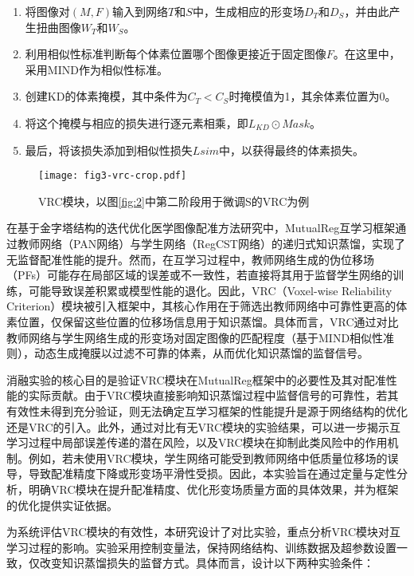 \begin{enumerate}
    \item 将图像对$(M,F)$输入到网络$T$和$S$中，生成相应的形变场$D_T$和$D_S$，并由此产生扭曲图像$W_T$和$W_S$。
    \item 利用相似性标准判断每个体素位置哪个图像更接近于固定图像$F$。在这里中，采用MIND作为相似性标准。
    \item 创建KD的体素掩模，其中条件为$C_T<C_S$时掩模值为1，其余体素位置为0。
    \item 将这个掩模与相应的损失进行逐元素相乘，即$L_{KD} \odot Mask$。
    \item 最后，将该损失添加到相似性损失$L{sim}$中，以获得最终的体素损失。
\end{enumerate}

\begin{figure}[h]
    \centering
    \texttt{[image: fig3-vrc-crop.pdf]}
    \caption{VRC模块，以图\ref{fig:2}中第二阶段用于微调S的VRC为例}
    \label{fig:3}
\end{figure}



在基于金字塔结构的迭代优化医学图像配准方法研究中，MutualReg互学习框架通过教师网络（PAN网络）与学生网络（RegCST网络）的递归式知识蒸馏，实现了无监督配准性能的提升。然而，在互学习过程中，教师网络生成的伪位移场（PFs）可能存在局部区域的误差或不一致性，若直接将其用于监督学生网络的训练，可能导致误差积累或模型性能的退化。因此，VRC（Voxel-wise Reliability Criterion）模块被引入框架中，其核心作用在于筛选出教师网络中可靠性更高的体素位置，仅保留这些位置的位移场信息用于知识蒸馏。具体而言，VRC通过对比教师网络与学生网络生成的形变场对固定图像的匹配程度（基于MIND相似性准则），动态生成掩膜以过滤不可靠的体素，从而优化知识蒸馏的监督信号。

消融实验的核心目的是验证VRC模块在MutualReg框架中的必要性及其对配准性能的实际贡献。由于VRC模块直接影响知识蒸馏过程中监督信号的可靠性，若其有效性未得到充分验证，则无法确定互学习框架的性能提升是源于网络结构的优化还是VRC的引入。此外，通过对比有无VRC模块的实验结果，可以进一步揭示互学习过程中局部误差传递的潜在风险，以及VRC模块在抑制此类风险中的作用机制。例如，若未使用VRC模块，学生网络可能受到教师网络中低质量位移场的误导，导致配准精度下降或形变场平滑性受损。因此，本实验旨在通过定量与定性分析，明确VRC模块在提升配准精度、优化形变场质量方面的具体效果，并为框架的优化提供实证依据。



为系统评估VRC模块的有效性，本研究设计了对比实验，重点分析VRC模块对互学习过程的影响。实验采用控制变量法，保持网络结构、训练数据及超参数设置一致，仅改变知识蒸馏损失的监督方式。具体而言，设计以下两种实验条件：

